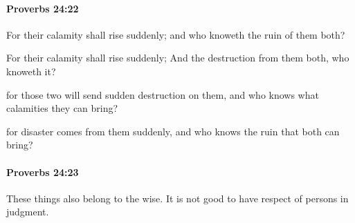 		\paragraph{Proverbs 24:22} %
			\label{PROVERBS-24-22}

			For their calamity shall rise suddenly; and who knoweth the ruin of them both?

			\begin{versebox}
					\item[BHS] 
					\item[ASV] For their calamity shall rise suddenly; And the destruction from them both, who knoweth it?
					\item[NIV] for those two will send sudden destruction on them, and who knows what calamities they can bring?
					\item[NRSV] for disaster comes from them suddenly, and who knows the ruin that both can bring?
			\end{versebox}

		\paragraph{Proverbs 24:23} %
			\label{PROVERBS-24-23}

			These things also belong to the wise. It is not good to have respect of persons in judgment.

